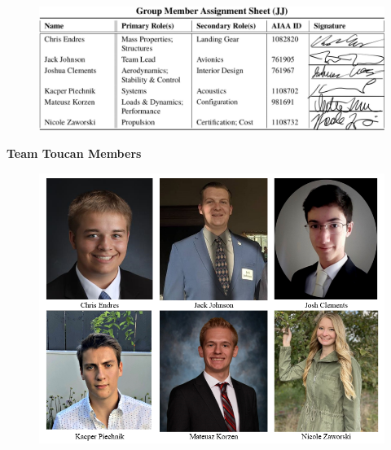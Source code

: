 \documentclass[conf]{new-aiaa}
\begin{document}


\newpage

\begin{figure}[!h]
    \centering
    \includegraphics[width=\linewidth]{Photos/signatures.JPG}
    \label{fig:my_label}
\end{figure}

\begin{center}
\large{ \textbf{Team Toucan Members}}
\end{center}

\begin{figure}[!h]
    \centering
    \includegraphics[width=\linewidth]{Photos/Toucan Headshots.png}
    \label{fig:my_label}
\end{figure}
\end{document}
